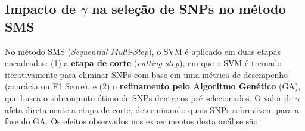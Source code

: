 \documentclass[12pt,a4paper]{article}
\newcommand{\novo}[1]{\textcolor{corNova}{#1}}
\begin{document}
\novo{\subsection*{Impacto de $\gamma$ na seleção de SNPs no método SMS}}

\novo{No método SMS (\textit{Sequential Multi-Step}), o SVM é aplicado em duas etapas encadeadas: (1) a \textbf{etapa de corte} (\textit{cutting step}), em que o SVM é treinado iterativamente para eliminar SNPs com base em uma métrica de desempenho (acurácia ou F1 Score), e (2) o \textbf{refinamento pelo Algoritmo Genético} (GA), que busca o subconjunto ótimo de SNPs dentre os pré-selecionados. O valor de $\gamma$ afeta diretamente a etapa de corte, determinando quais SNPs sobrevivem para a fase do GA. Os efeitos observados nos experimentos desta análise são:}
\end{document}
